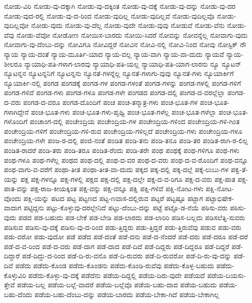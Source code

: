 {ನೋಡು-ವಿರಿ
ನೋಡು-ವು-ದಕ್ಕಾಗಿ
ನೋಡು-ವು-ದಕ್ಕಿಂತ
ನೋಡು-ವು-ದಕ್ಕೆ
ನೋಡು-ವು-ದನ್ನು
ನೋಡು-ವು-ದರ
ನೋಡು-ವುದ-ರಲ್ಲಿ
ನೋಡು-ವು-ದ-ರಿಂದ
ನೋಡು-ವುದಿಲ್ಲ
ನೋಡು-ವುದಿಲ್ಲವೆ
ನೋಡು-ವುದಿಲ್ಲವೊ
ನೋಡು-ವುದಿಲ್ಲವೋ
ನೋಡು-ವುದು
ನೋಡು-ವು-ದೆಲ್ಲ
ನೋಡು-ವುದೇ
ನೋಡು-ವುವು
ನೋಡುವೆ
ನೋಡು-ವೆನು
ನೋಡು-ವೆವು
ನೋಡು-ವೆವೋ
ನೋಡೋಣ
ನೋಯಿಸ-ಬಾರದು
ನೋಯಿ-ಸಿದರೆ
ನೋವನ್ನು
ನೋವನ್ನೆಲ್ಲ
ನೋವಾಗು-ವುದು
ನೋವಾಗು-ವು-ದೆಂಬು-ದನ್ನು
ನೋವಿಗೂ
ನೋವಿದ್ದರೆ
ನೋವಿನ
ನೋವಿ-ನಲ್ಲಿ
ನೋವಿ-ನಿಂದ
ನೋವು
ನೋಸ್ಟಿಕ್
ನೌ
ನ್ಯಾಯ
ನ್ಯಾಯ-ದಂತೆ
ನ್ಯಾಯ-ಮೂರ್ತಿ-ಯಾದ
ನ್ಯಾಯ-ವಲ್ಲ
ನ್ಯಾಯ-ವಾಗಿ
ನ್ಯಾಯ-ವಾ-ದುದು
ನ್ಯಾಯವೆ
ನ್ಯಾಯ-ಶೀಲರೂ
ನ್ಯಾಯಾಧಿ-ಪತಿ-ಗಳಾಗ-ಲಾರವು
ನ್ಯಾಯಾಧಿ-ಪತಿ-ಯಲ್ಲ
ನ್ಯಾಯಾಧಿ-ಪತಿ-ಯಾಗ-ಲಾರನು
ನ್ಯೂ
ನ್ಯೂಟನ್
ನ್ಯೂಟನ್ನನ
ನ್ಯೂಟನ್ನನಿಗೆ
ನ್ಯೂಟನ್ನನು
ನ್ಯೂನತೆ-ಗಳನ್ನೆಲ್ಲ
ನ್ಯೂನತೆ-ಗಳಾಗು-ವುವು
ನ್ಯೂನತೆ-ಗಳು
ನ್ಯೂಯಾರ್ಕಿಗೆ
ನ್ಯೂಯಾರ್ಕಿ-ನಲ್ಲಿ
ಪಂಗಡ
ಪಂಗಡಕ್ಕೆ
ಪಂಗಡ-ಗಳ
ಪಂಗಡ-ಗಳಂತೆ
ಪಂಗಡ-ಗಳನ್ನು
ಪಂಗಡ-ಗಳಲ್ಲಿ
ಪಂಗಡ-ಗಳಿಗೆ
ಪಂಗಡ-ಗಳಿವೆ
ಪಂಗಡ-ಗಳು
ಪಂಗಡ-ಗಳೂ
ಪಂಗಡ-ಗಳೇ
ಪಂಗಡದ
ಪಂಗಡ-ದಲ್ಲಿ
ಪಂಗಡ-ದ-ವರಲ್ಲೆಲ್ಲಾ
ಪಂಗಡ-ದ-ವರು
ಪಂಗಡ-ದ-ವರೂ
ಪಂಗಡ-ದೊಂದಿಗೆ
ಪಂಚ
ಪಂಚ-ತನ್ಮಾತ್ರ-ಗಳು
ಪಂಚ-ಭೂತ-ಗಳ
ಪಂಚ-ಭೂತ-ಗಳಾಗಿದ್ದೇನೆ
ಪಂಚ-ಭೂತ-ಗಳು
ಪಂಚ-ಭೂತ-ಗಳು-ಪೃಥ್ವಿ
ಪಂಚ-ಭೂತ-ಗಳೆಲ್ಲ
ಪಂಚ-ಭೂತ-ಗಳೆಲ್ಲಾ
ಪಂಚ-ಭೂತ-ಗಳೊಂದಿಗೆ
ಪಂಚಾಂಗ-ದಲ್ಲಿ
ಪಂಚೇಂದ್ರಿಯ
ಪಂಚೇಂದ್ರಿಯ-ಗಳ
ಪಂಚೇಂದ್ರಿಯ-ಗಳಿಂದ
ಪಂಚೇಂದ್ರಿಯ-ಗಳಿ-ಗಿಂತ
ಪಂಚೇಂದ್ರಿಯ-ಗಳಿಗೆ
ಪಂಚೇಂದ್ರಿಯ-ಗಳಿ-ರುವ
ಪಂಚೇಂದ್ರಿಯ-ಗಳಿಲ್ಲದೆ
ಪಂಚೇಂದ್ರಿಯ-ಗಳು
ಪಂಚೇಂದ್ರಿಯ-ಗಳೂ
ಪಂಚೇಂದ್ರಿಯ-ಗಳೇ
ಪಂಜ-ರ-ದಲ್ಲಿ
ಪಂಜಿ-ನಂತೆ
ಪಂಡಿತ
ಪಂಡಿ-ತನು
ಪಂಡಿ-ತನೂ
ಪಂಡಿ-ತರ
ಪಂಡಿತ-ರಾಗಿ-ರ-ಲಿಲ್ಲ
ಪಂಡಿತ-ರಾದರೆ
ಪಂಡಿ-ತರು
ಪಂಡಿ-ತರೂ
ಪಂಡಿತ-ರೆಂದು
ಪಂಡಿ-ತರೇ
ಪಂಥ
ಪಂಥಕ್ಕೆ
ಪಂಥ-ಗಳಿಗೂ
ಪಂಥ-ಗಳು
ಪಂಥ-ಗಳೂ
ಪಂಥ-ಗಳೆಲ್ಲ
ಪಂಥದ
ಪಂಥ-ದಲ್ಲಿ
ಪಂಥ-ದ-ವರ
ಪಂಥ-ದ-ವರು
ಪಂಥ-ದ-ವ-ರೊಂದಿಗೆ
ಪಂಥ-ವನ್ನೂ
ಪಂಥ-ವಾಗು-ವ-ವರೆಗೆ
ಪಂಥಾ-ತೀತ
ಪಂಥಾ-ತೀತ-ವಾ-ದುದು
ಪಕ್ಕದ
ಪಕ್ಕ-ದಲ್ಲಿ
ಪಕ್ಕ-ದಲ್ಲೆ
ಪಕ್ಕೆ-ಲುಬು-ಗಳ
ಪಕ್ವ-ತೆ-ಯನ್ನು
ಪಕ್ಷ
ಪಕ್ಷ-ಗಳನ್ನೂ
ಪಕ್ಷ-ಗಳಲ್ಲಿ
ಪಕ್ಷದ
ಪಕ್ಷ-ದಲ್ಲಿ
ಪಕ್ಷ-ದಲ್ಲೇ
ಪಕ್ಷ-ದ-ವ-ರಿಗೂ
ಪಕ್ಷ-ದ-ವರು
ಪಕ್ಷ-ಪಾತ
ಪಕ್ಷ-ಪಾತ-ವನ್ನು
ಪಕ್ಷ-ರಾಜ-ಕೀಯಕ್ಕಿಂತ
ಪಕ್ಷ-ವನ್ನು
ಪಕ್ಷ-ವನ್ನೂ
ಪಕ್ಷಿ
ಪಕ್ಷಿ-ಗಳಿವೆ
ಪಕ್ಷಿ-ನೋಟ-ಗಳು
ಪಕ್ಷಿ-ನೋಟ-ವೊಂದು
ಪಕ್ಷಿ-ಯನ್ನು
ಪಟದ
ಪಟ್ಟ
ಪಟ್ಟಣದ
ಪಟ್ಟ-ಣವಾಸ-ದಲ್ಲಿರುವ
ಪಟ್ಟರೆ
ಪಟ್ಟಷ್ಟೂ
ಪಟ್ಟಾಗ
ಪಟ್ಟಾಭಿಷೇಕ-ವಾದಾಗ
ಪಟ್ಟಿದ್ದನು
ಪಟ್ಟು-ಕೊಳ್ಳುವು-ದರಲ್ಲೇನಿದೆ
ಪಟ್ಟು-ದೆಂಬು-ದನ್ನು
ಪಟ್ಟೆ
ಪಟ್ಟೊ-ಡ-ನೆಯೆ
ಪಠಿಸು-ವರು
ಪಠಿಸು-ವುದು
ಪಡದ
ಪಡ-ಬಹುದು
ಪಡ-ಬೇಕೆ
ಪಡ-ಬೇಡಿ
ಪಡ-ಲಾರದು
ಪಡ-ಲಾರಿರಿ
ಪಡಿಸ-ಬಲ್ಲದು
ಪಡಿಸಲೆತ್ನಿ-ಸುವರು
ಪಡಿಸುವ
ಪಡಿಸು-ವು-ದಕ್ಕೆ
ಪಡಿಸು-ವು-ದ-ರಿಂದ
ಪಡು-ತ್ತಿದ್ದರು
ಪಡು-ತ್ತಿದ್ದರೆ
ಪಡು-ತ್ತಿರುವೆವು
ಪಡುವ
ಪಡು-ವರು
ಪಡು-ವರೋ
ಪಡು-ವುದೋ
ಪಡೆ
ಪಡೆದ
ಪಡೆ-ದಂತೆ
ಪಡೆ-ದನು
ಪಡೆ-ದ-ನೆಂದರೆ
ಪಡೆ-ದರು
ಪಡೆ-ದರೂ
ಪಡೆ-ದರೆ
ಪಡೆ-ದ-ವ-ರಿಂದ
ಪಡೆ-ದ-ವರು
ಪಡೆ-ದಾಗ
ಪಡೆ-ದಾದ
ಪಡೆ-ದಿದೆ
ಪಡೆ-ದಿದ್ದರು
ಪಡೆ-ದಿದ್ದರೂ
ಪಡೆ-ದಿದ್ದರೆ
ಪಡೆ-ದಿದ್ದಾರೆ
ಪಡೆ-ದಿದ್ದು-ದ-ರಿಂದ
ಪಡೆ-ದಿ-ರು-ವನೊ
ಪಡೆ-ದಿ-ರುವರು
ಪಡೆ-ದಿ-ರುವರೋ
ಪಡೆ-ದಿ-ರು-ವು-ದನ್ನು
ಪಡೆ-ದಿವೆ
ಪಡೆದು
ಪಡೆದು-ಕೊಂಡ
ಪಡೆದು-ಕೊಂಡನು
ಪಡೆದು-ಕೊಂಡಿ-ರುವೆವು
ಪಡೆದು-ಕೊಳ್ಳ-ಬಹುದು
ಪಡೆದು-ಕೊಳ್ಳುವಿರಿ
ಪಡೆದು-ಕೊಳ್ಳು-ವು-ದಕ್ಕೆ
ಪಡೆದೆನು
ಪಡೆಯ-ದಿದ್ದಲ್ಲಿ
ಪಡೆಯ-ದಿರು-ವುದೇ
ಪಡೆಯದೆ
ಪಡೆಯ-ಬಯಸು-ತ್ತೇವೆ
ಪಡೆಯ-ಬಲ್ಲ
ಪಡೆಯ-ಬಲ್ಲೆ-ವಾದರೆ
ಪಡೆಯ-ಬಲ್ಲೆವೊ
ಪಡೆಯ-ಬಹು-ದಾದ
ಪಡೆಯ-ಬಹುದು
ಪಡೆಯ-ಬಹು-ದೆಂದು
ಪಡೆಯ-ಬಹು-ದೆಂಬು-ದನ್ನು
ಪಡೆಯ-ಬಾರದು
ಪಡೆಯ-ಬೇಕಾ-ಗಿದೆ
ಪಡೆಯ-ಬೇಕಾಗಿಲ್ಲ
}
